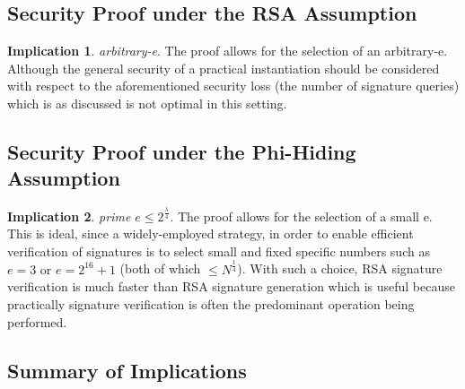 \documentclass[]{final_report}
\theoremstyle{definition}
\newtheorem{implication}{Implication}
\begin{document}
\subsection{Security Proof under the RSA Assumption}
\begin{implication} \textit{arbitrary-e}.
\label{IMP:RSA}
The proof allows for the selection of an arbitrary-e. Although the general security of a practical instantiation should be considered with respect to the aforementioned security loss (the number of signature queries) which is as discussed is not optimal in this setting. 

\end{implication}

\subsection{Security Proof under the Phi-Hiding Assumption}
\begin{implication} \textit{prime $e \leqslant \displaystyle2^{\frac{\lambda}{4}}$}.
\label{IMP:PHI}
The proof allows for the selection of a small e. This is ideal, since a widely-employed strategy, in order to enable efficient verification of signatures is to select small and fixed specific numbers such as $e = 3 \text{ or } e = 2^{16} + 1$ (both of which $\le N^{\frac{1}{4}}$). With such a choice, RSA signature verification is much faster than RSA signature generation which is useful because practically signature verification is often the predominant operation being performed.
\end{implication}

\subsection{Summary of Implications}
\end{document}

